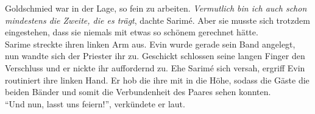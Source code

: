 Goldschmied war in der Lage, so fein zu arbeiten. \textit{Vermutlich bin ich auch schon mindestens 
die Zweite, die es trägt}, dachte Sarimé. Aber sie musste sich trotzdem eingestehen, dass sie 
niemals mit etwas so schönem gerechnet hätte.\\
Sarime streckte ihren linken Arm aus. Evin wurde gerade sein Band angelegt, nun wandte sich der 
Priester ihr zu. Geschickt schlossen seine langen Finger den Verschluss und er nickte ihr 
auffordernd zu. Ehe Sarimé sich versah, ergriff Evin routiniert ihre linken Hand. Er hob die ihre 
mit in die Höhe, sodass die Gäste die beiden Bänder und somit die Verbundenheit des Paares sehen 
konnten.\\
``Und nun, lasst uns feiern!'', verkündete er laut.\\



